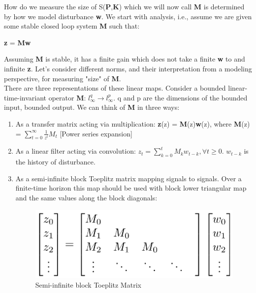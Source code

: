 \documentclass{article}[12pt]
\begin{document}
How do we measure the size of S(\textbf{P},\textbf{K}) which we will now call \textbf{M} is determined by how we model disturbance \textbf{w}. We start with analysis, i.e., assume we are given some stable closed loop system \textbf{M} such that:
\begin{center}
\textbf{z} = \textbf{Mw}    
\end{center}
Assuming \textbf{M} is stable, it has a finite gain which does not take a finite \textbf{w} to and infinite \textbf{z}. Let's consider different norms, and their interpretation from a modeling perspective, for measuring "size" of \textbf{M}.\\

There are three representations of these linear maps. Consider a bounded linear-time-invariant operator \textbf{M}: $l^{q}_{\infty} \xrightarrow{} l^p_{\infty}$. q and p are the dimensions of the bounded input, bounded output. We can think of \textbf{M} in three ways:
\begin{enumerate}
    \item As a transfer matrix acting via multiplication: \textbf{z}(z) = \textbf{M}(z)\textbf{w}(z), where \textbf{M}(z) = $\sum^{\infty}_{t=0}\frac{1}{z^t}M_t$ [Power series expansion]
    \item As a linear filter acting via convolution: $z_t = \sum^t_{k=0} M_k w_{t-k}, \forall t \geq 0$. $w_{t-k}$ is the history of disturbance.
    \item As a semi-infinite block Toeplitz matrix mapping signals to signals. Over a finite-time horizon this map should be used with block lower triangular map and the same values along the block diagonals:
    \begin{figure} [H]
        \centering
        \includegraphics[scale=.5]{figures/toeplitz.png}
        \caption{Semi-infinite block Toeplitz Matrix}
        \label{fig:toeplitz}
    \end{figure}
\end{enumerate}
\end{document}
